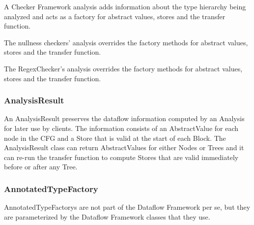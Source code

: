     A Checker Framework analysis adds information about the type hierarchy being analyzed and acts as a factory for abstract values, stores and the transfer function.

    

    The nullness checkers' analysis overrides the factory methods for abstract values, stores and the transfer function.

    
    The RegexChecker's analysis overrides the factory methods for abstract values, stores and the transfer function.



\subsubsection{AnalysisResult}
\label{sec:analysis_result_class}

    An AnalysisResult preserves the dataflow information computed by an Analysis for later use by clients.  The information consists of an AbstractValue for each node in the CFG and a Store that is valid at the start of each Block.  The AnalysisResult class can return AbstractValues for either Nodes or Trees and it can re-run the transfer function to compute Stores that are valid immediately before or after any Tree.



\subsubsection{AnnotatedTypeFactory}
\label{sec:annotated_type_factory_classes}

    AnnotatedTypeFactorys are not part of the Dataflow Framework per se, but they are parameterized by the Dataflow Framework classes that they use.

